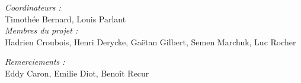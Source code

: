 
\usepackage{pdfpages}


\begin{center}
    \emph{Coordinateurs :}\\
    Timothée Bernard, Louis Parlant\bigskip\\
    \emph{Membres du projet :}\\
    Hadrien Croubois, Henri Derycke, Gaëtan Gilbert, Semen Marchuk, Luc Rocher
\end{center}
\begin{center}
    \emph{Remerciements :}\\
    Eddy Caron, Emilie Diot, Benoît Recur
\end{center}
\newpage
\tableofcontents
\newpage
